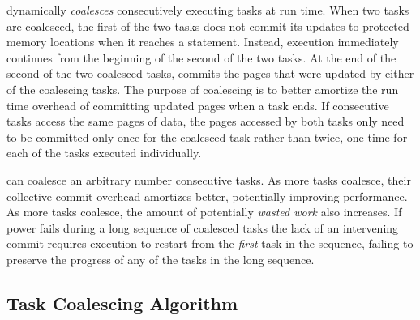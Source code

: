 \sys dynamically {\em coalesces} consecutively executing tasks at run time.
When two tasks are coalesced, the first of the two tasks does not commit its
updates to protected memory locations when it reaches a \transition statement.
Instead, execution immediately continues from the beginning of the second of
the two tasks.  At the end of the second of the two coalesced tasks, \sys
commits the pages that were updated by either of the coalescing tasks.  The
purpose of coalescing is to better amortize the run time overhead of committing
updated pages when a task ends. If consecutive tasks access the same pages of
data, the pages accessed by both tasks only need to be committed only once for
the coalesced task rather than twice, one time for each of the tasks executed
individually.  

\sys can coalesce an arbitrary number consecutive tasks.  As more tasks
coalesce, their collective commit overhead amortizes better, potentially
improving performance.  As more tasks coalesce, the amount of potentially {\em
wasted work} also increases. If power fails during a long sequence of coalesced
tasks the lack of an intervening commit requires execution to restart from the
{\em first} task in the sequence, failing to preserve the progress of any of
the tasks in the long sequence. 



\subsection{Task Coalescing Algorithm}

